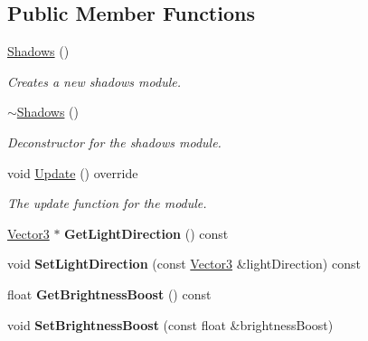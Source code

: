 \subsection*{Public Member Functions}
\begin{DoxyCompactItemize}
\item 
\hyperlink{class_flounder_1_1_shadows_af01b62b01f31c66a455a601400eb5486}{Shadows} ()
\begin{DoxyCompactList}\small\item\em Creates a new shadows module. \end{DoxyCompactList}\item 
\hyperlink{class_flounder_1_1_shadows_af1377013947d8ac915e397933c8a6c3f}{$\sim$\+Shadows} ()
\begin{DoxyCompactList}\small\item\em Deconstructor for the shadows module. \end{DoxyCompactList}\item 
void \hyperlink{class_flounder_1_1_shadows_a14478c216ad1927bb734d5883dc283de}{Update} () override
\begin{DoxyCompactList}\small\item\em The update function for the module. \end{DoxyCompactList}\item 
\mbox{\label{class_flounder_1_1_shadows_a546de5dd30642ecb105e690daaaf5d03}} 
\hyperlink{class_flounder_1_1_vector3}{Vector3} $\ast$ {\bfseries Get\+Light\+Direction} () const
\item 
\mbox{\label{class_flounder_1_1_shadows_a4d7b854ac215d3781fe3eaaefcde7c61}} 
void {\bfseries Set\+Light\+Direction} (const \hyperlink{class_flounder_1_1_vector3}{Vector3} \&light\+Direction) const
\item 
\mbox{\label{class_flounder_1_1_shadows_a178fce15169c0030f58fab38dabb6b7c}} 
float {\bfseries Get\+Brightness\+Boost} () const
\item 
\mbox{\label{class_flounder_1_1_shadows_a8be8e3386994a0bbb9c5eb77178b1bd8}} 
void {\bfseries Set\+Brightness\+Boost} (const float \&brightness\+Boost)
\item 
\mbox{\label{class_flounder_1_1_shadows_a72a7702524d5205ea67493170cdc6242}} 

\end{DoxyCompactItemize}
